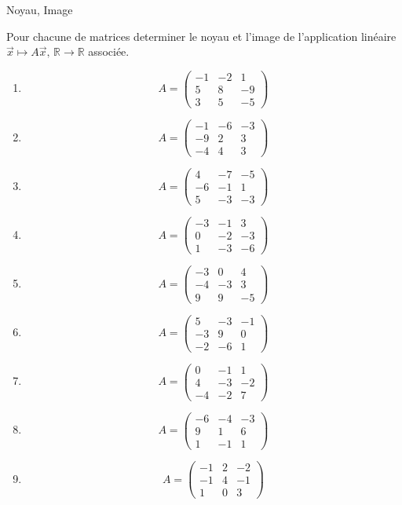 \documentclass{article}
\begin{document}
\newpage


\begin{center}
{\Huge Noyau, Image}
\end{center}

Pour chacune de matrices determiner le noyau et l'image de
l'application linéaire $\vec{x} \mapsto A\vec{x},\,\mathbb{R} \rightarrow \mathbb{R}$
associée.

\begin{enumerate}
	\item $$ A = 
\begin{pmatrix}
-1 & -2 & 1 \\ 
5 & 8 & -9 \\ 
3 & 5 & -5
\end{pmatrix}
$$
\item $$ A = 
\begin{pmatrix}
-1 & -6 & -3 \\ 
-9 & 2 & 3 \\ 
-4 & 4 & 3
\end{pmatrix}
$$
\item $$ A = 
\begin{pmatrix}
4 & -7 & -5 \\ 
-6 & -1 & 1 \\ 
5 & -3 & -3
\end{pmatrix}
$$
\item $$ A = 
\begin{pmatrix}
-3 & -1 & 3 \\ 
0 & -2 & -3 \\ 
1 & -3 & -6
\end{pmatrix}
$$
\item $$ A = 
\begin{pmatrix}
-3 & 0 & 4 \\ 
-4 & -3 & 3 \\ 
9 & 9 & -5
\end{pmatrix}
$$
\item $$ A = 
\begin{pmatrix}
5 & -3 & -1 \\ 
-3 & 9 & 0 \\ 
-2 & -6 & 1
\end{pmatrix}
$$
\item $$ A = 
\begin{pmatrix}
0 & -1 & 1 \\ 
4 & -3 & -2 \\ 
-4 & -2 & 7
\end{pmatrix}
$$
\item $$ A = 
\begin{pmatrix}
-6 & -4 & -3 \\ 
9 & 1 & 6 \\ 
1 & -1 & 1
\end{pmatrix}
$$
\item $$ A = 
\begin{pmatrix}
-1 & 2 & -2 \\ 
-1 & 4 & -1 \\ 
1 & 0 & 3
\end{pmatrix}
$$


\end{enumerate}
\end{document}
